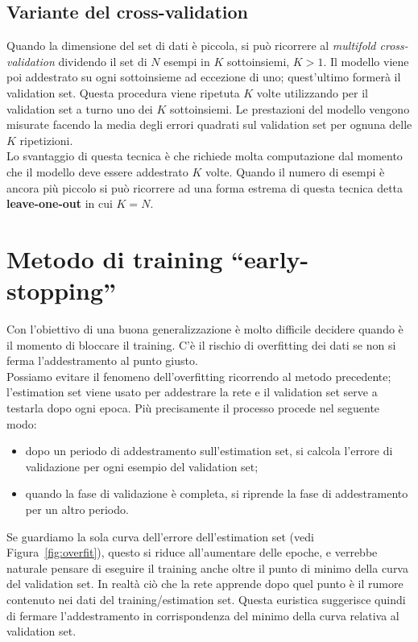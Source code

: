 \subsection{Variante del cross-validation} %
\label{sub:variante_del_cross_validation}
Quando la dimensione del set di dati è piccola, si può ricorrere al \emph{multifold cross-validation} dividendo il set di $N$ esempi in $K$ sottoinsiemi, $K>1$. Il modello viene poi addestrato su ogni sottoinsieme ad eccezione di uno; quest'ultimo formerà il validation set. Questa procedura viene ripetuta $K$ volte utilizzando per il validation set a turno uno dei $K$ sottoinsiemi. Le prestazioni del modello vengono misurate facendo la media degli errori quadrati sul validation set per ognuna delle $K$ ripetizioni.\\
Lo svantaggio di questa tecnica è che richiede molta computazione dal momento che il modello deve essere addestrato $K$ volte.
Quando il numero di esempi è ancora più piccolo si può ricorrere ad una forma estrema di questa tecnica detta \textbf{leave-one-out} in cui $K=N$.

\newpage

\section{Metodo di training “early-stopping”} %
\label{sec:metodo_di_training_early_stopping_}
Con l’obiettivo di una buona generalizzazione è molto difficile decidere quando è il momento di bloccare il training. C'è il rischio di overfitting dei dati se non si ferma l'addestramento al punto giusto.\\
Possiamo evitare il fenomeno dell'overfitting ricorrendo al metodo precedente; l'estimation set viene usato per addestrare la rete e il validation set serve a testarla dopo ogni epoca. Più precisamente il processo procede nel seguente modo:
\begin{itemize}
    \item dopo un periodo di addestramento sull'estimation set, si calcola l'errore di validazione per ogni esempio del validation set;
    \item quando la fase di validazione è completa, si riprende la fase di addestramento per un altro periodo.
\end{itemize}

Se guardiamo la sola curva dell'errore dell’estimation set (vedi Figura~\ref{fig:overfit}), questo si riduce all’aumentare delle epoche, e verrebbe naturale pensare di eseguire il training anche oltre il punto di minimo della curva del validation set. In realtà ciò che la rete apprende dopo quel punto è il rumore contenuto nei dati del training/estimation set. Questa euristica suggerisce quindi di fermare l'addestramento in corrispondenza del minimo della curva relativa al validation set.
\newpage

